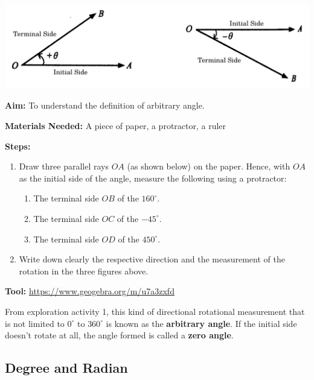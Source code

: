 \documentclass{report}
\begin{document}
\begin{center}
	\includegraphics[scale=0.23]{assets/8-2.png}
\end{center}

\begin{explore}
	    
	\textbf{Aim:} To understand the definition of arbitrary angle.
	
	\textbf{Materials Needed:} A piece of paper, a protractor, a ruler
	
	\textbf{Steps:}
	\vspace{-1em}
	\begin{enumerate}
		\item Draw three parallel rays $OA$ (as shown below) on the paper. Hence, with $OA$ as the initial side of the angle, measure the following using a protractor:
		      \begin{enumerate}
		      	\item The terminal side $OB$ of the $160^\circ$.
		      	\item The terminal side $OC$ of the $-45^\circ$.
		      	\item The terminal side $OD$ of the $450^\circ$.
		      \end{enumerate}
		\item Write down clearly the respective direction and the measurement of the rotation in the three figures above.
	\end{enumerate}
	
	\textbf{Tool:} \underline{\url{https://www.geogebra.org/m/u7a3zxfd}}
\end{explore}

From exploration activity 1, this kind of directional rotational measurement that is not limited to $0^\circ$ to $360^\circ$ is known as the \textbf{arbitrary angle}. If the initial side doesn't rotate at all, the angle formed is called a \textbf{zero angle}.

\subsection*{Degree and Radian}
\end{document}
